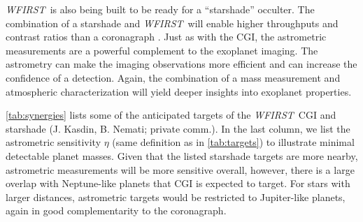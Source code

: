 \documentclass[modern, times]{aastex61}
\newcommand\wfirst{\textit{WFIRST}}
\begin{document}
\wfirst\ is also being built to be ready for a ``starshade'' occulter.  The combination of a starshade  and \wfirst\ will enable higher throughputs and contrast ratios than a coronagraph \citep{Roberge2015}.  Just as with the CGI, the astrometric measurements are a powerful complement to the exoplanet imaging.  The astrometry can make the imaging observations more efficient and can increase the confidence of a detection.  Again, the combination of a mass measurement and atmospheric characterization will yield deeper insights into exoplanet properties.

\autoref{tab:synergies} lists some of the anticipated  targets of the \wfirst\ CGI and starshade (J. Kasdin, B. Nemati; private comm.).
In the last column, we list the astrometric sensitivity $\eta$ (same definition as in \autoref{tab:targets}) to illustrate minimal detectable planet masses.
Given that the listed starshade targets are more nearby, astrometric measurements will be more sensitive overall, however, there is a large overlap with Neptune-like planets that CGI is expected to target.
For stars with larger distances, astrometric targets would be restricted to Jupiter-like planets, again in good complementarity to the coronagraph.
\end{document}
